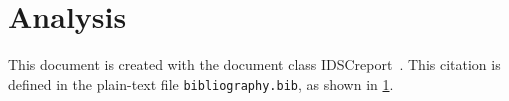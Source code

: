 
\chapter{Analysis}
\label{chp:AnalysisChapter}

This document is created with the document class IDSCreport~\cite{IDSCreportClass}. This citation is defined in the plain-text file \texttt{bibliography.bib}, as shown in \cref{chp:AnalysisChapter}.
